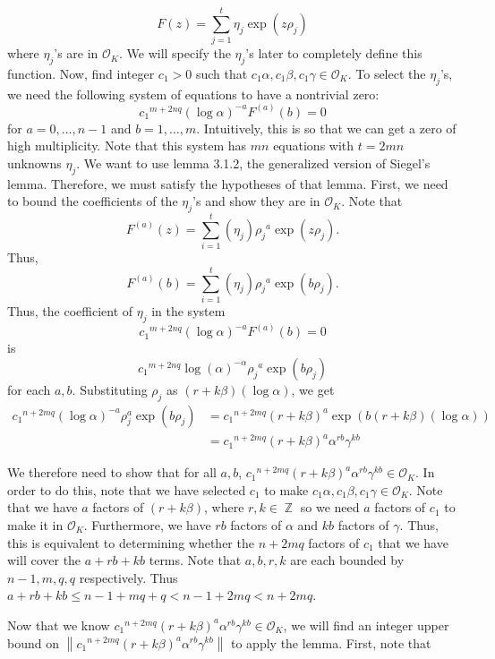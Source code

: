 \documentclass[a4paper, 11pt]{book}
\DeclareMathOperator{\Z}{\mathbb{Z}}
\begin{document}
{\[F(z) = \sum\limits_{j=1}^{t}\eta_{j}\exp(z\rho_j)\]
where $\eta_j$'s are in $\mathcal{O}_K$. We will specify the $\eta_j$'s later to completely define this function. Now, find integer $c_1 > 0$ such that $c_1 \alpha, c_1 \beta, c_1 \gamma \in \mathcal{O}_K$. To select the $\eta_j$'s, we need the following system of equations to have a nontrivial zero: 
    \[{c_1}^{m + 2nq} {(\log \alpha)}^{-a}F^{(a)}(b) = 0\]
    for $a = 0, \ldots, n-1$ and $b = 1, \ldots, m$. Intuitively, this is so that we can get a zero of high multiplicity. Note that this system has $mn$ equations with $t = 2mn$ unknowns $\eta_j$. We want to use lemma 3.1.2, the generalized version of Siegel's lemma. Therefore, we must satisfy the hypotheses of that lemma. First, we need to bound the coefficients of the $\eta_j$'s and show they are in $\mathcal{O}_K$. Note that \[F^{(a)}(z) = \sum\limits_{i=1}^{t}(\eta_j){\rho_j}^{a}\exp(z\rho_j).\] Thus, \[F^{(a)}(b) = \sum\limits_{i=1}^{t}(\eta_j){\rho_j}^{a}\exp(b\rho_j).\] Thus, the coefficient of $\eta_j$ in the system \[{c_1}^{m + 2nq} {(\log \alpha)}^{-a}F^{(a)}(b) = 0\] is \[{c_1}^{m + 2nq} {\log(\alpha)}^{-\alpha}{\rho_j}^{a}\exp(b\rho_j)\] for each $a, b$. Substituting $\rho_j$ as $(r+k\beta)(\log \alpha)$, we get 
\begin{align*}
    {c_1}^{n+2mq}{(\log \alpha)}^{-a}\rho_j^{a}\exp(b\rho_j) &= {c_1}^{n+2mq}{(r + k\beta)}^{a}\exp\left(b(r+k\beta)(\log \alpha)\right) \\
                                                                &= {c_1}^{n+2mq}{(r+k\beta)}^{a}{\alpha}^{rb}\gamma^{kb}
\end{align*}

We therefore need to show that for all $a, b$, ${c_1}^{n+2mq}{(r+k\beta)}^{a}{\alpha}^{rb}\gamma^{kb} \in \mathcal{O}_K$. In order to do this, note that we have selected $c_1$ to make $c_1\alpha, c_1\beta, c_1\gamma \in \mathcal{O}_K$. Note that we have $a$ factors of $(r + k \beta)$, where $r, k \in \Z$ so we need $a$ factors of $c_1$ to make it in $\mathcal{O}_K$. Furthermore, we have $rb$ factors of $\alpha$ and $kb$ factors of $\gamma$. Thus, this is equivalent to determining whether the $n + 2mq$ factors of $c_1$ that we have will cover the $a + rb + kb$ terms. Note that $a, b, r, k$ are each bounded by $n-1, m, q, q$ respectively. Thus $a + rb + kb \leq n-1 + mq + q < n-1 + 2mq < n + 2mq$.\par

Now that we know ${c_1}^{n+2mq}{(r+k\beta)}^{a}{\alpha}^{rb}\gamma^{kb} \in \mathcal{O}_K$, we will find an integer upper bound on $\left\| {c_1}^{n+2mq}{(r+k\beta)}^{a}{\alpha}^{rb}\gamma^{kb} \right\|$ to apply the lemma. First, note that 

}
\end{document}
